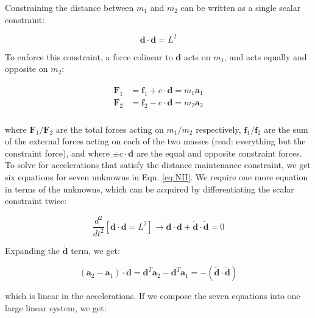 \documentclass[]{article}
\begin{document}
	Constraining the distance between $m_1$ and $m_2$ can be written as a single scalar constraint:

	\begin{equation*}
		\mathbf{d} \cdot \mathbf{d} = L^2
	\end{equation*}

	To enforce this constraint, a force colinear to $\mathbf{d}$ acts on $m_1$, and acts equally and opposite on $m_2$:

	\begin{align}
	\begin{split}
		\label{eq:NII}
		\mathbf{F}_1 &= \mathbf{f}_1 + c \cdot \mathbf{d} = m_1 \mathbf{a}_1 \\
		\mathbf{F}_2 &= \mathbf{f}_2 - c \cdot \mathbf{d} = m_2 \mathbf{a}_2 \\
	\end{split}
	\end{align}

	where $\mathbf{F}_1/\mathbf{F}_2$ are the total forces acting on $m_1/m_2$ respectively, $\mathbf{f}_1/\mathbf{f}_2$ are the sum of the external forces acting on each of the two masses (read:  everything but the constraint force), and where $\pm c \cdot \mathbf{d}$ are the equal and opposite constraint forces.  To solve for accelerations that satisfy the distance maintenance constraint, we get six equations for seven unknowns in Eqn. \eqref{eq:NII}.  We require one more equation in terms of the unknowns, which can be acquired by differentiating the scalar constraint twice:

	\begin{equation*}
		\frac{d^2}{dt^2} \left[ \mathbf{d} \cdot \mathbf{d} = L^2 \right] \rightarrow \ddot{\mathbf{d}} \cdot \mathbf{d} + \dot{\mathbf{d}} \cdot \dot{\mathbf{d}} = 0
	\end{equation*}

	Expanding the $\ddot{\mathbf{d}}$ term, we get:

	\begin{equation*}
		(\mathbf{a}_2 - \mathbf{a}_1) \cdot \mathbf{d} = \mathbf{d}^T \mathbf{a}_2 - \mathbf{d}^T \mathbf{a}_1 = - (\dot{\mathbf{d}} \cdot \dot{\mathbf{d}})
	\end{equation*}

	which is linear in the accelerations.  If we compose the seven equations into one large linear system, we get:
\end{document}
